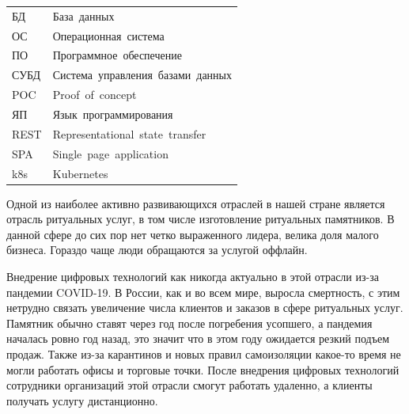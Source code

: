 \documentclass[a4paper,article,14pt]{extarticle}
\begin{document}




\begin{table}[h]
\begin{tabular}{ll}
БД   & База~данных                       \\
ОС   & Операционная~система~             \\
ПО   & Программное~обеспечение           \\
СУБД & Система~управления~базами~данных  \\
POC  & Proof~of~concept                  \\
ЯП   & Язык~программирования             \\
REST & Representational~state~transfer   \\
SPA  & Single~page~application           \\
k8s  & Kubernetes                       
\end{tabular}
\end{table}

\pagebreak

\tableofcontents
\pagebreak









Одной из наиболее активно развивающихся отраслей в нашей стране является отрасль ритуальных услуг,
в том числе изготовление ритуальных памятников. 
В данной сфере до сих пор нет четко выраженного лидера, велика доля малого бизнеса.
Гораздо чаще люди обращаются за услугой оффлайн.

Внедрение цифровых технологий как никогда актуально в этой отрасли из-за пандемии COVID-19.
В России, как и во всем мире, выросла смертность, с этим нетрудно связать увеличение числа клиентов и заказов в сфере ритуальных услуг.
Памятник обычно ставят через год после погребения усопшего, а пандемия началась ровно год назад,
это значит что в этом году ожидается резкий подъем продаж. 
Также из-за карантинов и новых правил самоизоляции какое-то время не могли работать офисы и торговые точки. 
После внедрения цифровых технологий сотрудники организаций этой отрасли смогут работать удаленно, а клиенты получать услугу дистанционно.
\end{document}
